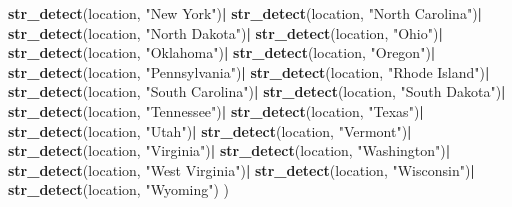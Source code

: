 \documentclass[
]{article}
\newenvironment{Shaded}{\begin{snugshade}}{\end{snugshade}}
\newcommand{\KeywordTok}[1]{\textcolor[rgb]{0.13,0.29,0.53}{\textbf{#1}}}
\newcommand{\NormalTok}[1]{#1}
\newcommand{\OperatorTok}[1]{\textcolor[rgb]{0.81,0.36,0.00}{\textbf{#1}}}
\newcommand{\StringTok}[1]{\textcolor[rgb]{0.31,0.60,0.02}{#1}}
\begin{document}
\begin{Shaded}
\begin{Highlighting}[]
{{\StringTok{                                                  }\KeywordTok{str_detect}\NormalTok{(location, }\StringTok{"New York"}\NormalTok{)}\OperatorTok{|}
\StringTok{                                                  }\KeywordTok{str_detect}\NormalTok{(location, }\StringTok{"North Carolina"}\NormalTok{)}\OperatorTok{|}
\StringTok{                                                  }\KeywordTok{str_detect}\NormalTok{(location, }\StringTok{"North Dakota"}\NormalTok{)}\OperatorTok{|}
\StringTok{                                                  }\KeywordTok{str_detect}\NormalTok{(location, }\StringTok{"Ohio"}\NormalTok{)}\OperatorTok{|}
\StringTok{                                                  }\KeywordTok{str_detect}\NormalTok{(location, }\StringTok{"Oklahoma"}\NormalTok{)}\OperatorTok{|}
\StringTok{                                                  }\KeywordTok{str_detect}\NormalTok{(location, }\StringTok{"Oregon"}\NormalTok{)}\OperatorTok{|}
\StringTok{                                                  }\KeywordTok{str_detect}\NormalTok{(location, }\StringTok{"Pennsylvania"}\NormalTok{)}\OperatorTok{|}
\StringTok{                                                  }\KeywordTok{str_detect}\NormalTok{(location, }\StringTok{"Rhode Island"}\NormalTok{)}\OperatorTok{|}
\StringTok{                                                  }\KeywordTok{str_detect}\NormalTok{(location, }\StringTok{"South Carolina"}\NormalTok{)}\OperatorTok{|}
\StringTok{                                                  }\KeywordTok{str_detect}\NormalTok{(location, }\StringTok{"South Dakota"}\NormalTok{)}\OperatorTok{|}
\StringTok{                                                  }\KeywordTok{str_detect}\NormalTok{(location, }\StringTok{"Tennessee"}\NormalTok{)}\OperatorTok{|}
\StringTok{                                                  }\KeywordTok{str_detect}\NormalTok{(location, }\StringTok{"Texas"}\NormalTok{)}\OperatorTok{|}
\StringTok{                                                  }\KeywordTok{str_detect}\NormalTok{(location, }\StringTok{"Utah"}\NormalTok{)}\OperatorTok{|}
\StringTok{                                                  }\KeywordTok{str_detect}\NormalTok{(location, }\StringTok{"Vermont"}\NormalTok{)}\OperatorTok{|}
\StringTok{                                                  }\KeywordTok{str_detect}\NormalTok{(location, }\StringTok{"Virginia"}\NormalTok{)}\OperatorTok{|}
\StringTok{                                                  }\KeywordTok{str_detect}\NormalTok{(location, }\StringTok{"Washington"}\NormalTok{)}\OperatorTok{|}
\StringTok{                                                  }\KeywordTok{str_detect}\NormalTok{(location, }\StringTok{"West Virginia"}\NormalTok{)}\OperatorTok{|}
\StringTok{                                                  }\KeywordTok{str_detect}\NormalTok{(location, }\StringTok{"Wisconsin"}\NormalTok{)}\OperatorTok{|}
\StringTok{                                                  }\KeywordTok{str_detect}\NormalTok{(location, }\StringTok{"Wyoming"}\NormalTok{)}
\NormalTok{)}

}}
\end{Highlighting}
\end{Shaded}
\end{document}
